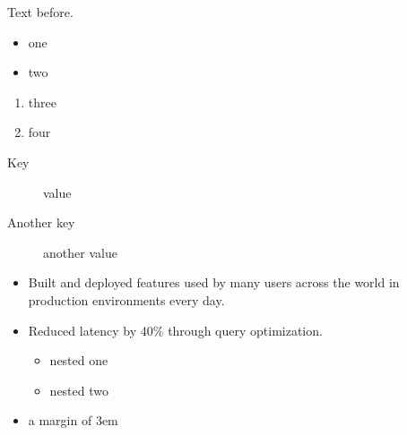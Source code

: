 \documentclass{article}
\begin{document}
Text before.
\begin{itemize}\item one \item two\end{itemize}
\begin{enumerate}\item three \item[x] four\end{enumerate}
\begin{description}\item[Key] value \item[Another key] another value\end{description}
\begin{itemize}[nosep, leftmargin=*]
\item Built and deployed features used by many users across the world in production environments every day.
\item Reduced latency by 40\% through query optimization.
\begin{itemize}[noitemsep]\item nested one \item nested two\end{itemize}
\end{itemize}
\begin{itemize}[leftmargin=3em]\item a margin of 3em\end{itemize}
\end{document}
